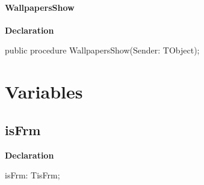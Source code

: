 \documentclass{report}
\newif\ifpdf
\begin{document}
\paragraph*{WallpapersShow}\hspace*{\fill}

\label{thinstall.TisFrm-WallpapersShow}
\begin{list}{}{
\setlength{\itemindent}{0cm}
\setlength{\listparindent}{0cm}
\setlength{\leftmargin}{\evensidemargin}
\addtolength{\leftmargin}{\tmplength}
\settowidth{\labelsep}{X}
\addtolength{\leftmargin}{\labelsep}
\setlength{\labelwidth}{\tmplength}
}
\item[\textbf{Declaration}\hfill]
\ifpdf
\begin{flushleft}
\fi
\begin{ttfamily}
public procedure WallpapersShow(Sender: TObject);\end{ttfamily}

\ifpdf
\end{flushleft}
\fi

\end{list}
\section{Variables}
\ifpdf
\subsection*{\large{\textbf{isFrm}}\normalsize\hspace{1ex}\hrulefill}
\else
\subsection*{isFrm}
\fi
\label{thinstall-isFrm}
\begin{list}{}{
\setlength{\itemindent}{0cm}
\setlength{\listparindent}{0cm}
\setlength{\leftmargin}{\evensidemargin}
\addtolength{\leftmargin}{\tmplength}
\settowidth{\labelsep}{X}
\addtolength{\leftmargin}{\labelsep}
\setlength{\labelwidth}{\tmplength}
}
\item[\textbf{Declaration}\hfill]
\ifpdf
\begin{flushleft}
\fi
\begin{ttfamily}
isFrm: TisFrm;\end{ttfamily}

\ifpdf
\end{flushleft}
\fi

\end{list}
\end{document}
